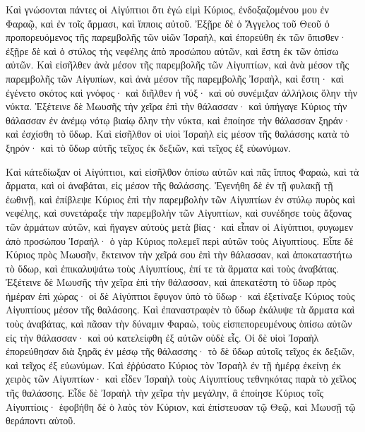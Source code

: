 {Καὶ γνώσονται πάντες οἱ Αἰγύπτιοι ὅτι ἐγώ εἰμὶ Κύριος, ἐνδοξαζομένου μου ἐν Φαραῷ, καὶ ἐν τοῖς ἅρμασι, καὶ ἵπποις αὐτοῦ.
Ἐξῇρε δὲ ὁ Ἄγγελος τοῦ Θεοῦ ὁ προπορευόμενος τῆς παρεμβολῆς τῶν υἱῶν Ἰσραὴλ, καὶ ἐπορεύθη ἐκ τῶν ὄπισθεν· ἐξῇρε δὲ καὶ ὁ στύλος τὴς νεφέλης ἀπὸ προσώπου αὐτῶν, καὶ ἔστη ἐκ τῶν ὀπίσω αὐτῶν.
Καὶ εἰσῆλθεν ἀνὰ μέσον τῆς παρεμβολῆς τῶν Αἰγυπτίων, καὶ ἀνὰ μέσον τῆς παρεμβολῆς τῶν Αἰγυπίων, καὶ ἀνὰ μέσον τῆς παρεμβολῆς Ἰσραὴλ, καὶ ἔστη· καὶ ἐγένετο σκότος καὶ γνόφος· καὶ διῆλθεν ἡ νύξ· καὶ οὐ συνέμιξαν ἀλλήλοις ὅλην τὴν νύκτα.
Ἐξέτεινε δὲ Μωυσῆς τὴν χεῖρα ἐπὶ τὴν θάλασσαν· καὶ ὑπήγαγε Κύριος τὴν θάλασσαν ἐν ἀνέμῳ νότῳ βιαίῳ ὅλην τὴν νύκτα, καὶ ἐποίησε τὴν θάλασσαν ξηράν· καὶ ἐσχίσθη τὸ ὕδωρ.
Καὶ εἰσῆλθον οἱ υἱοὶ Ἰσραὴλ εἰς μέσον τῆς θαλάσσης κατὰ τὸ ξηρόν· καὶ τὸ ὕδωρ αὐτῆς τεῖχος ἐκ δεξιῶν, καὶ τεῖχος ἐξ εὐωνύμων.
\par }{\PP {}Καὶ κάτεδίωξαν οἱ Αἰγύπτιοι, καὶ εἰσῆλθον ὀπίσω αὐτῶν καὶ πᾶς ἵππος Φαραὼ, καὶ τὰ ἅρματα, καὶ οἱ ἀναβάται, εἰς μέσον τῆς θαλάσσης.
Ἐγενήθη δὲ ἐν τῇ φυλακῇ τῇ ἑωθινῇ, καὶ ἐπίβλεψε Κύριος ἐπὶ τὴν παρεμβολὴν τῶν Αἰγυπτίων ἐν στύλῳ πυρὸς καὶ νεφέλης, καὶ συνετάραξε τὴν παρεμβολὴν τῶν Αἰγυπτίων,
καὶ συνέδησε τοὺς ἄξονας τῶν ἁρμάτων αὐτῶν, καὶ ἤγαγεν αὐτοὺς μετὰ βίας· καὶ εἶπαν οἱ Αἰγύπτιοι, φυγωμεν ἀπὸ προσώπου Ἰσραήλ· ὁ γὰρ Κύριος πολεμεῖ περὶ αὐτῶν τοὺς Αἰγυπτίους.
Εἶπε δὲ Κύριος πρὸς Μωυσῆν, ἔκτεινον τὴν χεῖρά σου ἐπὶ τὴν θάλασσαν, καὶ ἀποκαταστήτω τὸ ὕδωρ, καὶ ἐπικαλυψάτω τοὺς Αἰγυπτίους, ἐπί τε τὰ ἅρματα καὶ τοὺς ἀναβάτας.
Ἐξέτεινε δὲ Μωυσῆς τὴν χεῖρα ἐπὶ τὴν θάλασσαν, καὶ ἀπεκατέστη τὸ ὕδωρ πρὸς ἡμέραν ἐπὶ χώρας· οἱ δὲ Αἰγύπτιοι ἔφυγον ὑπὸ τὸ ὕδωρ· καὶ ἐξετίναξε Κύριος τοὺς Αἰγυπτίους μέσον τῆς θαλάσοης.
Καὶ ἐπαναστραφὲν τὸ ὕδωρ ἐκάλυψε τὰ ἅρματα καὶ τοὺς ἀναβάτας, καὶ πᾶσαν τὴν δύναμιν Φαραὼ, τοὺς εἰσπεπορευμένους ὀπίσω αὐτῶν εἰς τὴν θάλασσαν· καὶ οὐ κατελείφθη ἐξ αὐτῶν οὐδὲ εἷς.
Οἱ δὲ υἱοὶ Ἰσραὴλ ἐπορεύθησαν διὰ ξηρᾶς ἐν μέσῳ τῆς θάλασσης· τὸ δὲ ὕδωρ αὐτοῖς τεῖχος ἐκ δεξιῶν, καὶ τεῖχος ἐξ εὐωνύμων.
Καὶ ἐῤῥύσατο Κύριος τὸν Ἰσραὴλ ἐν τῇ ἡμέρᾳ ἐκείνῃ ἐκ χειρὸς τῶν Αἰγυπτίων· καὶ εἶδεν Ἰσραὴλ τοὺς Αἰγυπτίους τεθνηκότας παρὰ τὸ χεῖλος τῆς θαλάσσης.
Εἶδε δὲ Ἰσραὴλ τὴν χεῖρα τὴν μεγάλην, ἃ ἐποίησε Κύριος τοῖς Αἰγυπτίοις· ἐφοβήθη δὲ ὁ λαὸς τὸν Κύριον, καὶ ἐπίστευσαν τῷ Θεῷ, καὶ Μωυσῇ τῷ θεράποντι αὐτοῦ.

}
